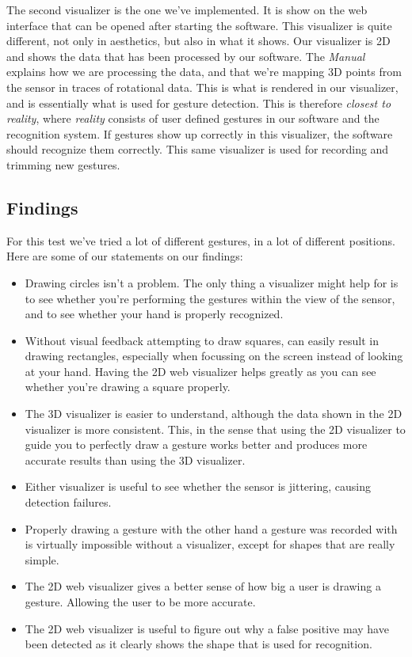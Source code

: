 \documentclass[a4paper]{article}
\begin{document}
  The second visualizer is the one we've implemented. It is show on the web
  interface that can be opened after starting the software. This visualizer is
  quite different, not only in aesthetics, but also in what it shows. Our
  visualizer is 2D and shows the data that has been processed by our software.
  The \emph{Manual} explains how we are processing the data, and that we're
  mapping 3D points from the sensor in traces of rotational data. This is what
  is rendered in our visualizer, and is essentially what is used for gesture
  detection. This is therefore \emph{closest to reality}, where \emph{reality}
  consists of user defined gestures in our software and the recognition system.
  If gestures show up correctly in this visualizer, the software should
  recognize them correctly. This same visualizer is used for recording and
  trimming new gestures.

  \subsection{Findings}
  For this test we've tried a lot of different gestures, in a lot of different
  positions. Here are some of our statements on our findings:

  \begin{itemize}
    \item Drawing circles isn't a problem. The only thing a visualizer might
      help for is to see whether you're performing the gestures within the
      view of the sensor, and to see whether your hand is properly recognized.
    \item Without visual feedback attempting to draw squares, can easily result
      in drawing rectangles, especially when focussing on the screen instead of
      looking at your hand. Having the 2D web visualizer helps greatly as you
      can see whether you're drawing a square properly.
    \item The 3D visualizer is easier to understand, although the data shown in
      the 2D visualizer is more consistent. This, in the sense that using the 2D
      visualizer to guide you to perfectly draw a gesture works better and
      produces more accurate results than using the 3D visualizer.
    \item Either visualizer is useful to see whether the sensor is
      jittering, causing detection failures.
    \item Properly drawing a gesture with the other hand a gesture was
      recorded with is virtually impossible without a visualizer, except for
      shapes that are really simple.
    \item The 2D web visualizer gives a better sense of how big a user is
      drawing a gesture. Allowing the user to be more accurate.
    \item The 2D web visualizer is useful to figure out why a false positive may
      have been detected as it clearly shows the shape that is used for
      recognition.
  \end{itemize}
\end{document}
